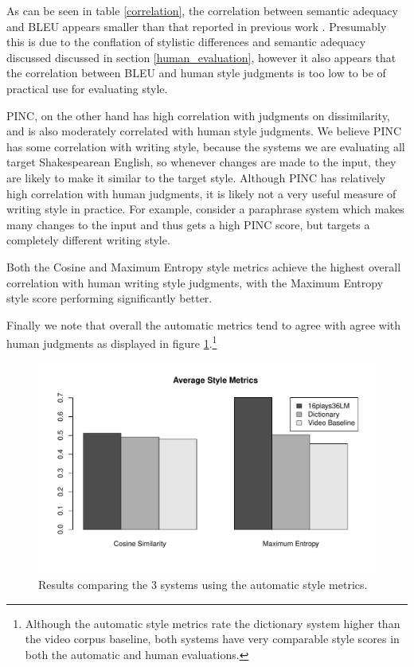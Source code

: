 \documentclass[10pt,a5paper,twoside]{article}
\begin{document}
As can be seen in table \ref{correlation}, the correlation between semantic adequacy and BLEU appears smaller than that reported in previous work \cite{chen11}.  Presumably this is
due to the conflation of stylistic differences and semantic adequacy discussed discussed in section \ref{human_evaluation}, however it also appears 
that the correlation between BLEU and human style judgments is too low to be of practical use for evaluating style.

PINC, on the other hand has high correlation with judgments on dissimilarity, and is also moderately correlated with human style
judgments.  We believe PINC has some correlation with writing style, because the systems we are evaluating all target Shakespearean English, 
so whenever changes are made to the input, they are likely to make it similar to the target style.
Although PINC has relatively high correlation with human judgments, it is likely not a very useful measure of writing style in practice.
For example, consider a paraphrase system which makes many changes to the input and thus gets a high PINC score, but targets a completely different writing style.

Both the Cosine and Maximum Entropy style metrics achieve the highest overall correlation with human writing style judgments, with the Maximum Entropy style score performing significantly better.

Finally we note that overall the automatic metrics tend to agree with agree with human judgments as displayed in figure \ref{style_metrics}.\footnote{
  Although the automatic style metrics rate the dictionary system higher than the video corpus baseline, both systems have very comparable
  style scores in both the automatic and human evaluations.
}

\begin{figure}
  \begin{center}
    \includegraphics[width=5in]{figures/style_metrics.pdf}
    \end{center}
    \caption{Results comparing the 3 systems using the automatic style metrics.}
    \label{style_metrics}
\end{figure}
\end{document}
